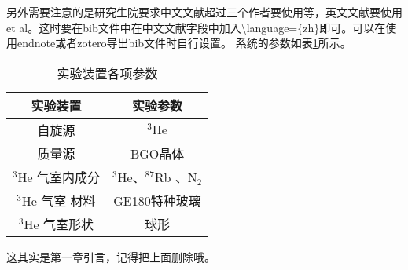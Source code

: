 另外需要注意的是研究生院要求中文文献超过三个作者要使用等，英文文献要使用et  al。这时要在bib文件中在中文文献字段中加入\textbackslash language=$\{$zh$\}$即可。可以在使用endnote或者zotero导出bib文件时自行设置。
系统的参数如表\ref{tab:1.1}所示。

\begin{table}[htbp]%
	\centering
	\caption{ 实验装置各项参数}
	\label{tab:1.1}  
	\begin{tabular}{cc}%
        \toprule[2pt]
		实验装置& 实验参数 \\
        \midrule[1pt]
		自旋源 &$^3$He  \\
 质量源&BGO晶体 \\
 $^3$He 气室内成分& $^3$He、$^{87}$Rb 、N$ _2 $ \\
$^3$He 气室 材料& GE180特种玻璃 \\
$^3$He 气室形状 &球形 \\
        \bottomrule[2pt]
	\end{tabular}
\end{table}

这其实是第一章引言，记得把上面删除哦。

